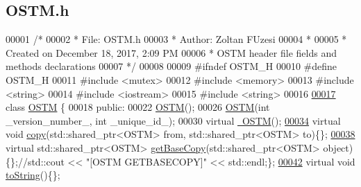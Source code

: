 \hypertarget{_o_s_t_m_8h_source}{}\subsection{O\+S\+T\+M.\+h}

\begin{DoxyCode}
00001 \textcolor{comment}{/* }
00002 \textcolor{comment}{ * File:   OSTM.h}
00003 \textcolor{comment}{ * Author: Zoltan FUzesi}
00004 \textcolor{comment}{ *}
00005 \textcolor{comment}{ * Created on December 18, 2017, 2:09 PM}
00006 \textcolor{comment}{ * OSTM header file fields and  methods declarations}
00007 \textcolor{comment}{ */}
00008 
00009 \textcolor{preprocessor}{#ifndef OSTM\_H}
00010 \textcolor{preprocessor}{#define OSTM\_H}
00011 \textcolor{preprocessor}{#include <mutex>}
00012 \textcolor{preprocessor}{#include <memory>}
00013 \textcolor{preprocessor}{#include <string>}
00014 \textcolor{preprocessor}{#include <iostream>}
00015 \textcolor{preprocessor}{#include <string>}
00016 
\hypertarget{_o_s_t_m_8h_source.tex_l00017}{}\hyperlink{class_o_s_t_m}{00017} \textcolor{keyword}{class }\hyperlink{class_o_s_t_m}{OSTM} \{
00018 \textcolor{keyword}{public}:
00022     \hyperlink{class_o_s_t_m_a968edf778668bd0ec7603f0571619196_a968edf778668bd0ec7603f0571619196}{OSTM}();
00026     \hyperlink{class_o_s_t_m_a968edf778668bd0ec7603f0571619196_a968edf778668bd0ec7603f0571619196}{OSTM}(\textcolor{keywordtype}{int} \_version\_number\_, \textcolor{keywordtype}{int} \_unique\_id\_);
00030     \textcolor{keyword}{virtual} \hyperlink{class_o_s_t_m_a30a17d73d0259c60eeab72d6dfa9ceb1_a30a17d73d0259c60eeab72d6dfa9ceb1}{~OSTM}();
\hypertarget{_o_s_t_m_8h_source.tex_l00034}{}\hyperlink{class_o_s_t_m_a535d90fced5adbb70312c92f3778e08d_a535d90fced5adbb70312c92f3778e08d}{00034}     \textcolor{keyword}{virtual} \textcolor{keywordtype}{void} \hyperlink{class_o_s_t_m_a535d90fced5adbb70312c92f3778e08d_a535d90fced5adbb70312c92f3778e08d}{copy}(std::shared\_ptr<OSTM> from, std::shared\_ptr<OSTM> to)\{\};  
\hypertarget{_o_s_t_m_8h_source.tex_l00038}{}\hyperlink{class_o_s_t_m_a0bfa3763bd441407dd6365f42714f94c_a0bfa3763bd441407dd6365f42714f94c}{00038}     \textcolor{keyword}{virtual} std::shared\_ptr<OSTM> \hyperlink{class_o_s_t_m_a0bfa3763bd441407dd6365f42714f94c_a0bfa3763bd441407dd6365f42714f94c}{getBaseCopy}(std::shared\_ptr<OSTM> \textcolor{keywordtype}{object})\{\};\textcolor{comment}{//std::cout <<
       "[OSTM GETBASECOPY]" << std::endl;\};}
\hypertarget{_o_s_t_m_8h_source.tex_l00042}{}\hyperlink{class_o_s_t_m_a513396a115f2987fd07c203309ae8a59_a513396a115f2987fd07c203309ae8a59}{00042} \textcolor{comment}{}    \textcolor{keyword}{virtual} \textcolor{keywordtype}{void} \hyperlink{class_o_s_t_m_a513396a115f2987fd07c203309ae8a59_a513396a115f2987fd07c203309ae8a59}{toString}()\{\};

\end{DoxyCode}
